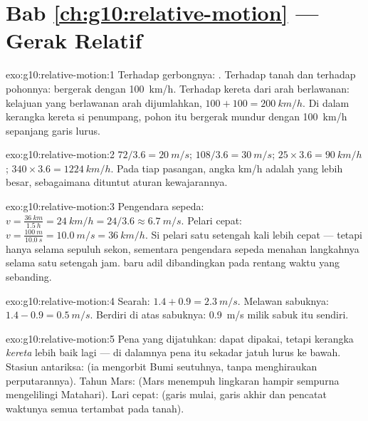 \section*{Bab \ref{ch:g10:relative-motion} --- Gerak Relatif}

\begin{solution}{exo:g10:relative-motion:1}
Terhadap gerbongnya: . Terhadap tanah dan terhadap pohonnya:
bergerak dengan \qty{100}{km/h}. Terhadap kereta dari arah berlawanan:
kelajuan yang berlawanan arah dijumlahkan,
$100 + 100 = \qty{200}{km/h}$. Di dalam kerangka kereta si penumpang,
pohon itu bergerak mundur dengan \qty{100}{km/h} sepanjang garis lurus.
\end{solution}

\begin{solution}{exo:g10:relative-motion:2}
$72 / 3.6 = \qty{20}{m/s}$; $108 / 3.6 = \qty{30}{m/s}$;
$25 \times 3.6 = \qty{90}{km/h}$; $340 \times 3.6 = \qty{1224}{km/h}$.
Pada tiap pasangan, angka \unit{km/h} adalah yang lebih besar,
sebagaimana dituntut aturan kewajarannya.
\end{solution}

\begin{solution}{exo:g10:relative-motion:3}
Pengendara sepeda: $v = \frac{\qty{36}{km}}{\qty{1.5}{h}} = \qty{24}{km/h}
= 24/3.6 \approx \qty{6.7}{m/s}$. Pelari cepat:
$v = \frac{\qty{100}{m}}{\qty{10.0}{s}} = \qty{10.0}{m/s}
= \qty{36}{km/h}$. Si pelari satu setengah kali lebih cepat --- tetapi
hanya selama sepuluh sekon, sementara pengendara sepeda menahan
langkahnya selama satu setengah jam.  baru adil
dibandingkan pada rentang waktu yang sebanding.
\end{solution}

\begin{solution}{exo:g10:relative-motion:4}
Searah: $1.4 + 0.9 = \qty{2.3}{m/s}$. Melawan sabuknya:
$1.4 - 0.9 = \qty{0.5}{m/s}$. Berdiri  di atas sabuknya:
\qty{0.9}{m/s} milik sabuk itu sendiri.
\end{solution}

\begin{solution}{exo:g10:relative-motion:5}
Pena yang dijatuhkan:  dapat dipakai, tetapi kerangka
\emph{kereta} lebih baik lagi --- di dalamnya pena itu sekadar jatuh
lurus ke bawah. Stasiun antariksa:  (ia mengorbit
Bumi seutuhnya, tanpa menghiraukan perputarannya). Tahun Mars:  (Mars menempuh lingkaran hampir sempurna mengelilingi
Matahari). Lari cepat:  (garis mulai, garis akhir dan
pencatat waktunya semua tertambat pada tanah).
\end{solution}

